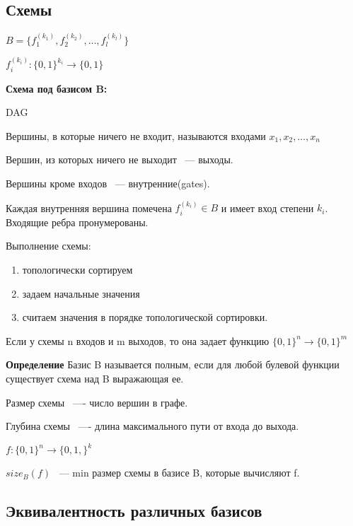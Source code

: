\documentclass[12pt]{article}
\begin{document}
\subsection{Схемы}

$B = \{f_1^{(k_1)},f_2^{(k_2)}, \ldots, f_l^{(k_l)} \}$

$f_i^{(k_i)}:\{0, 1\}^{k_i} \to \{0, 1\}$

\begin{description}
\item{\bf Схема под базисом B:}

DAG

Вершины, в которые ничего не входит, называются входами $x_1, x_2, \ldots, x_n$

Вершин, из которых ничего не выходит ~--- выходы.

Вершины кроме входов ~--- внутренние(gates).

Каждая внутренняя вершина помечена $f_i^{(k_i)} \in B$ и имеет вход степени $k_i$. Входящие ребра пронумерованы.

Выполнение схемы:

\begin{enumerate}
\item топологически сортируем
\item задаем начальные значения
\item считаем значения в порядке топологической сортировки.
\end{enumerate}

Если у схемы n входов и m выходов, то она задает функцию $\{0, 1\}^n \to \{0, 1\}^m$

{\bf Определение} Базис B называется полным, если для любой булевой функции существует схема над B выражающая ее.

Размер схемы ~---- число вершин в графе.

Глубина схемы ~---- длина максимального пути от входа до выхода.

$f:\{0, 1\}^n \to \{0, 1,\}^k$

$size_B(f)$ ~--- min размер схемы в базисе B, которые вычисляют f.
\end{description}

\subsection{Эквивалентность различных базисов}
\end{document}
